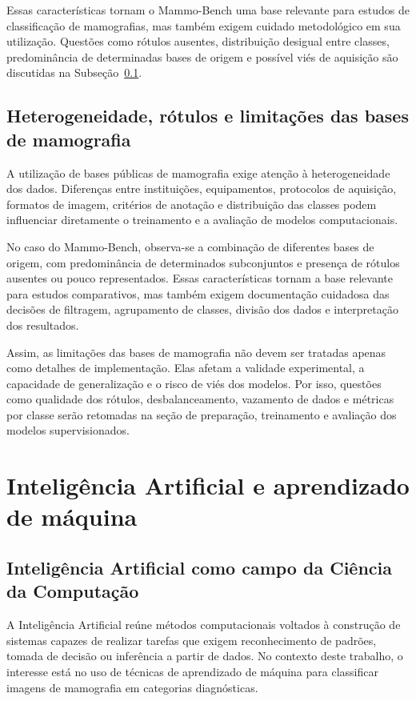 \documentclass[
    12pt,
    openright,
    oneside,
    a4paper,
    english,
    brazil
]{abntex2}
\begin{document}
Essas características tornam o Mammo-Bench uma base relevante para estudos de classificação de mamografias, mas também exigem cuidado metodológico em sua utilização. Questões como rótulos ausentes, distribuição desigual entre classes, predominância de determinadas bases de origem e possível viés de aquisição são discutidas na Subseção~\ref{subsec:heterogeneidade_rotulos_limitacoes_bases}.



\subsection{Heterogeneidade, rótulos e limitações das bases de mamografia}
\label{subsec:heterogeneidade_rotulos_limitacoes_bases}

A utilização de bases públicas de mamografia exige atenção à heterogeneidade dos dados. Diferenças entre instituições, equipamentos, protocolos de aquisição, formatos de imagem, critérios de anotação e distribuição das classes podem influenciar diretamente o treinamento e a avaliação de modelos computacionais.

No caso do Mammo-Bench, observa-se a combinação de diferentes bases de origem, com predominância de determinados subconjuntos e presença de rótulos ausentes ou pouco representados. Essas características tornam a base relevante para estudos comparativos, mas também exigem documentação cuidadosa das decisões de filtragem, agrupamento de classes, divisão dos dados e interpretação dos resultados.

Assim, as limitações das bases de mamografia não devem ser tratadas apenas como detalhes de implementação. Elas afetam a validade experimental, a capacidade de generalização e o risco de viés dos modelos. Por isso, questões como qualidade dos rótulos, desbalanceamento, vazamento de dados e métricas por classe serão retomadas na seção de preparação, treinamento e avaliação dos modelos supervisionados.
\section{Inteligência Artificial e aprendizado de máquina}

\subsection{Inteligência Artificial como campo da Ciência da Computação}

A Inteligência Artificial reúne métodos computacionais voltados à construção de sistemas capazes de realizar tarefas que exigem reconhecimento de padrões, tomada de decisão ou inferência a partir de dados. No contexto deste trabalho, o interesse está no uso de técnicas de aprendizado de máquina para classificar imagens de mamografia em categorias diagnósticas.
\end{document}
